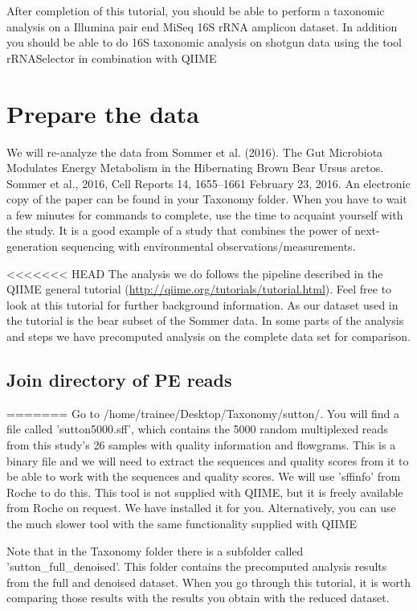 After completion of this tutorial, you should be able to perform a taxonomic analysis on a Illumina pair end MiSeq 16S rRNA amplicon dataset. In addition you should be able to do 16S taxonomic analysis on shotgun data using the tool rRNASelector in combination with QIIME

\section{Prepare the data}

We will re-analyze the data from Sommer et al. (2016). The Gut Microbiota Modulates Energy Metabolism in the Hibernating Brown Bear Ursus arctos. Sommer et al., 2016, Cell Reports 14, 1655–1661 February 23, 2016. An electronic copy of the paper can be found in your Taxonomy folder. When you have to wait a few minutes for commands to complete, use the time to acquaint yourself with the study. It is a good example of a study that combines the power of next-generation sequencing with environmental observations/measurements.

<<<<<<< HEAD
The analysis we do follows the pipeline described in the QIIME general tutorial (\url{http://qiime.org/tutorials/tutorial.html}). Feel free to look at this tutorial for further background information. As our dataset used in the tutorial is the bear subset of the Sommer data. In some parts of the analysis and steps we have precomputed analysis on the complete data set for comparison.

\subsection{Join directory of PE reads}
=======
Go to /home/trainee/Desktop/Taxonomy/sutton/. You will find a file called 'sutton5000.sff', which contains the 5000 random multiplexed reads from this study's 26 samples with quality information and flowgrams. This is a binary file and we will need to extract the sequences and quality scores from it to be able to work with the sequences and quality scores. We will use 'sffinfo' from Roche to do this. This tool is not supplied with QIIME, but it is freely available from Roche on request. We have installed it for you. Alternatively, you can use the much slower tool with the same functionality supplied with QIIME

Note that in the Taxonomy folder there is a subfolder called 'sutton\_full\_denoised'. This folder contains the precomputed analysis results from the full and denoised dataset. When you go through this tutorial, it is worth comparing those results with the results you obtain with the reduced dataset. 

